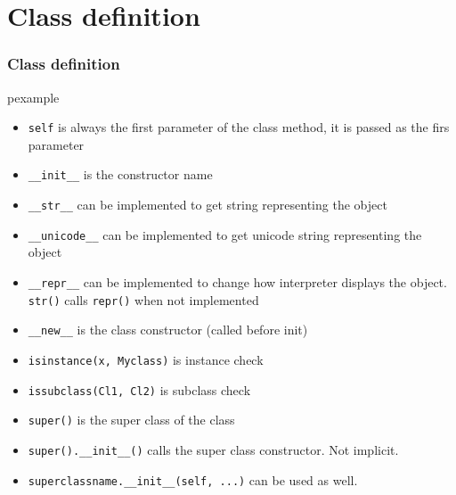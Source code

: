 \documentclass[trans,compress,xcolor=table]{beamer}
\begin{document}
\section{Class definition}
\begin{frame}
\frametitle{Class definition}
\begin{beamercolorbox}{pexample}
\codeclass
\end{beamercolorbox}
\end{frame}
\begin{frame}
\begin{itemize}
\item \lstinline!self! is always the first parameter of the class method, it is
     passed as the firs parameter
\item \lstinline!__init__! is the constructor name
\item \lstinline!__str__! can be implemented to get string representing the object
\item \lstinline!__unicode__! can be implemented to get unicode string representing the object
\item \lstinline!__repr__! can be implemented to change how interpreter displays the object. 
	\lstinline!str()! calls \lstinline!repr()! when not implemented
\item \lstinline!__new__! is the class constructor (called before init)
\item \lstinline!isinstance(x, Myclass)! is instance check
\item \lstinline!issubclass(Cl1, Cl2)! is subclass check
\item \lstinline!super()! is the super class of the class
\item \lstinline!super().__init__()! calls the super class constructor. Not implicit.
\item \lstinline!superclassname.__init__(self, ...)! can be used as well.
\end{itemize}
\end{frame}
\end{document}
